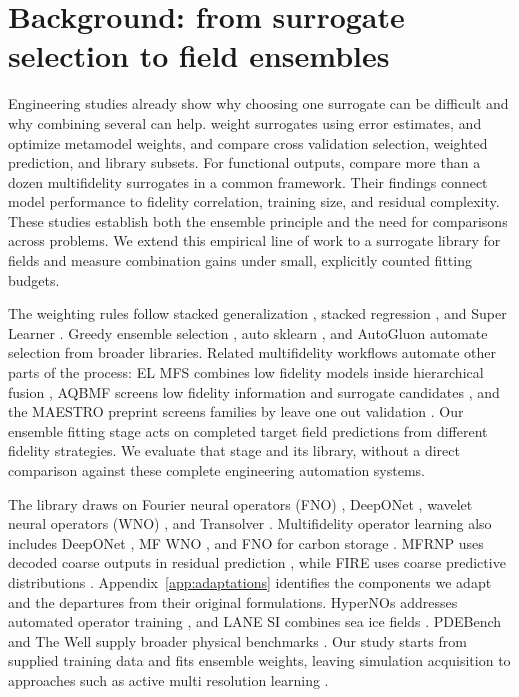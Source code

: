 \section{Background: from surrogate selection to field ensembles}
\label{sec:related}
Engineering studies already show why choosing one surrogate can be difficult
and why combining several can help. \citet{goel2007} weight surrogates using
error estimates, \citet{acar2009} and \citet{stromberg2021} optimize metamodel weights, and
\citet{viana2009} compare cross validation selection, weighted prediction, and
library subsets. For functional outputs, \citet{brunel2025} compare more than
a dozen multifidelity surrogates in a common framework. Their findings connect
model performance to fidelity correlation, training size, and residual
complexity. These studies establish both the ensemble principle and the need
for comparisons across problems. We extend this empirical line of work to a
surrogate library for fields and measure combination gains under small,
explicitly counted fitting budgets.

The weighting rules follow stacked generalization \citep{wolpert1992}, stacked
regression \citep{breiman1996}, and Super Learner \citep{superlearner2007}.
Greedy ensemble selection \citep{caruana2004}, auto sklearn
\citep{feurer2015,feurer2022}, and AutoGluon \citep{erickson2020} automate
selection from broader libraries. Related multifidelity workflows automate
other parts of the process: EL MFS combines low fidelity models inside
hierarchical fusion \citep{wang2024elmfs}, AQBMF screens low fidelity information
and surrogate candidates \citep{lee2026aqbmf}, and the MAESTRO preprint screens
families by leave one out validation \citep{kim2026maestro}. Our ensemble fitting
stage acts on completed target field predictions from different fidelity
strategies. We evaluate that stage and its library, without a direct comparison
against these complete engineering automation systems.

The library draws on Fourier neural operators (FNO) \citep{li2021fno}, DeepONet
\citep{lu2021}, wavelet neural operators (WNO) \citep{tripura2022wno}, and Transolver
\citep{wu2024transolver}. Multifidelity operator learning also includes
DeepONet \citep{howard2023}, MF WNO \citep{thakur2022mf}, and FNO for carbon
storage \citep{tang2023}. MFRNP uses decoded coarse outputs in residual prediction
\citep{niu2024}, while FIRE uses coarse predictive distributions
\citep{yu2026fire}. Appendix~\ref{app:adaptations} identifies the components we
adapt and the departures from their original formulations. HyperNOs addresses
automated operator training \citep{ghiotto2025}, and LANE SI combines sea ice
fields \citep{borisova2024}. PDEBench and The Well supply broader physical
benchmarks \citep{takamoto2022,ohana2024}. Our study starts from supplied training
data and fits ensemble weights, leaving simulation acquisition to approaches
such as active multi resolution learning \citep{li2024active}.

